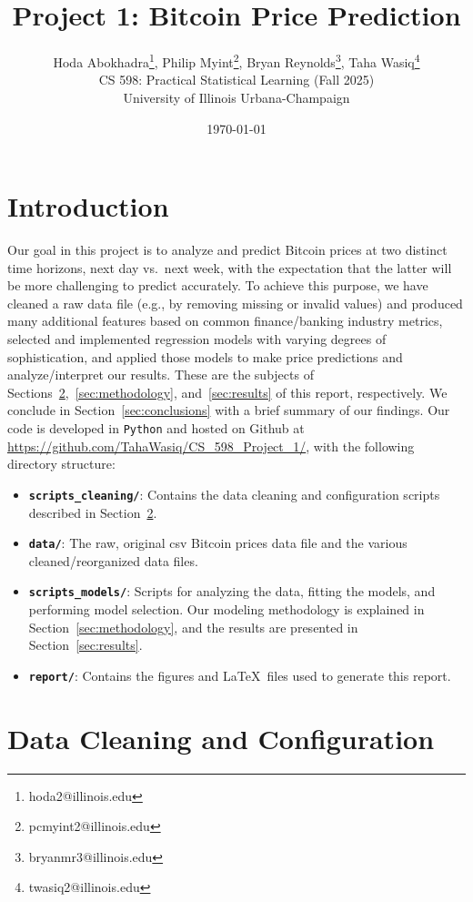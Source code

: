 \documentclass{article}
\title{Project 1: Bitcoin Price Prediction}
\author{Hoda Abokhadra\thanks{hoda2@illinois.edu},
Philip Myint\thanks{pcmyint2@illinois.edu}, 
Bryan Reynolds\thanks{bryanmr3@illinois.edu}, 
Taha Wasiq\thanks{twasiq2@illinois.edu}
\\CS 598: Practical Statistical Learning (Fall 2025)
\\University of Illinois Urbana-Champaign}
\date{\today}
\begin{document}
\maketitle

\section{Introduction}

Our goal in this project is to analyze and predict Bitcoin prices at two distinct time horizons, next day vs.\ next week, with the expectation that the latter will be more challenging to predict accurately. To achieve this purpose, we have cleaned a raw data file (e.g., by removing missing or invalid values) and produced many additional features based on common finance/banking industry metrics, selected and implemented regression models with varying degrees of sophistication, and applied those models to make price predictions and analyze/interpret our results. These are the subjects of Sections~\ref{sec:data_cleaning_configuration},~\ref{sec:methodology}, and~\ref{sec:results} of this report, respectively. We conclude in Section~\ref{sec:conclusions} with a brief summary of our findings. Our code is developed in \texttt{Python} and hosted on Github at \url{https://github.com/TahaWasiq/CS\_598\_Project\_1/}, with the following directory structure:
\begin{itemize}
    \item \textbf{\texttt{scripts\_cleaning/}}: Contains the data cleaning and configuration scripts described in Section~\ref{sec:data_cleaning_configuration}.
    \item \textbf{\texttt{data/}}: The raw, original csv Bitcoin prices data file and the various cleaned/reorganized data files.
    \item \textbf{\texttt{scripts\_models/}}: Scripts for analyzing the data, fitting the models, and performing model selection. Our modeling methodology is explained in Section~\ref{sec:methodology}, and the results are presented in Section~\ref{sec:results}.
    \item \textbf{\texttt{report/}}: Contains the figures and \LaTeX ~files used to generate this report.
\end{itemize}

\section{Data Cleaning and Configuration}
\label{sec:data_cleaning_configuration}
\end{document}
